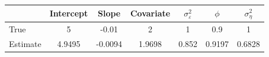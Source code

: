 \begin{tabular}{lcccccc}
\toprule
& Intercept & Slope & Covariate & $\sigma_\varepsilon^2$ & $\phi$ & $\sigma_\eta^2$ \\
\midrule
True & 5 & -0.01 & 2 & 1 & 0.9 & 1 \\
Estimate & 4.9495 & -0.0094 & 1.9698 & 0.852 & 0.9197 & 0.6828 \\
\bottomrule
\end{tabular}
